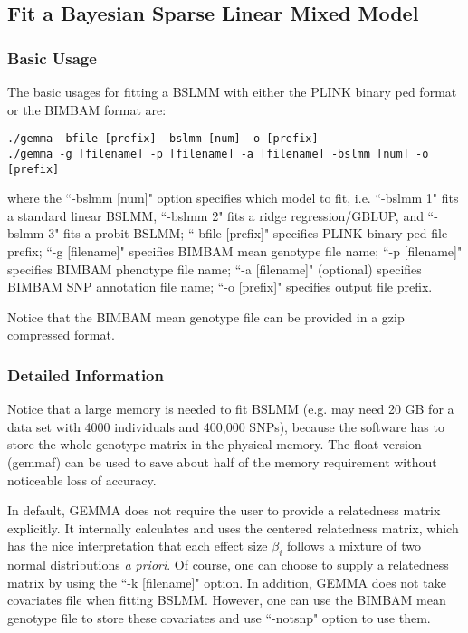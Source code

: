 \documentclass[11pt]{article}
\begin{document}
\subsection{Fit a Bayesian Sparse Linear Mixed Model}
\subsubsection{Basic Usage}
The basic usages for fitting a BSLMM with either the PLINK binary ped format or the BIMBAM format are:
\begin{verbatim}
./gemma -bfile [prefix] -bslmm [num] -o [prefix]
./gemma -g [filename] -p [filename] -a [filename] -bslmm [num] -o [prefix]
\end{verbatim}
where the ``-bslmm [num]" option specifies which model to fit, i.e. ``-bslmm 1" fits a standard linear BSLMM, ``-bslmm 2" fits a ridge regression/GBLUP, and ``-bslmm 3" fits a probit BSLMM; ``-bfile [prefix]" specifies PLINK binary ped file prefix; ``-g [filename]" specifies BIMBAM mean genotype file name; ``-p [filename]" specifies BIMBAM phenotype file name; ``-a [filename]" (optional) specifies BIMBAM SNP annotation file name; ``-o [prefix]" specifies output file prefix. 

Notice that the BIMBAM mean genotype file can be provided in a gzip compressed format.

\subsubsection{Detailed Information}
Notice that a large memory is needed to fit BSLMM (e.g. may need 20 GB for a data set with 4000 individuals and 400,000 SNPs), because the software has to store the whole genotype matrix in the physical memory. The float version (gemmaf) can be used to save about half of the memory requirement without noticeable loss of accuracy. 

In default, GEMMA does not require the user to provide a relatedness matrix explicitly. It internally calculates and uses the centered relatedness matrix, which has the nice interpretation that each effect size $\beta_i$ follows a mixture of two normal distributions {\it a priori}. Of course, one can choose to supply a relatedness matrix by using the ``-k [filename]" option. In addition, GEMMA does not take covariates file when fitting BSLMM. However, one can use the BIMBAM mean genotype file to store these covariates and use ``-notsnp" option to use them. 
\end{document}
